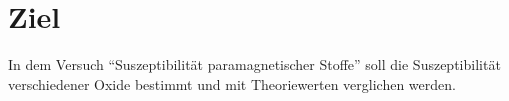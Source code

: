 \section{Ziel}
\label{sec:Ziel}

In dem Versuch \enquote{Suszeptibilität paramagnetischer Stoffe}  soll die
Suszeptibilität verschiedener Oxide bestimmt und mit Theoriewerten verglichen werden.